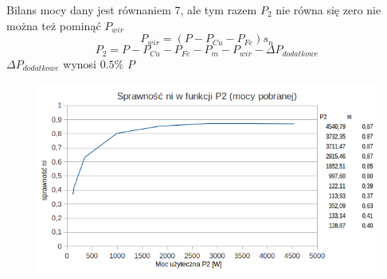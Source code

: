 \documentclass[12pt]{article}
\begin{document}
Bilans mocy dany jest równaniem 7, ale tym razem $P_2$ nie równa się zero nie można też pominąć $P_{wir}$
\begin{equation}
	P_{wir}=(P-P_{Cu}-P_{Fe})s_n
\end{equation}
\begin{equation}
	P_2=P-P_{Cu}-P_{Fe}-P_{m}-P_{wir}-\Delta P_{dodatkowe}
\end{equation}	
$\Delta P_{dodatkowe}$ wynosi $0.5\%$ $P$
\nopagebreak
	\begin{figure}[H]
			\centering
			\includegraphics[width=12 cm]{ch_obciazeniowa2}
	\end{figure}
\end{document}
